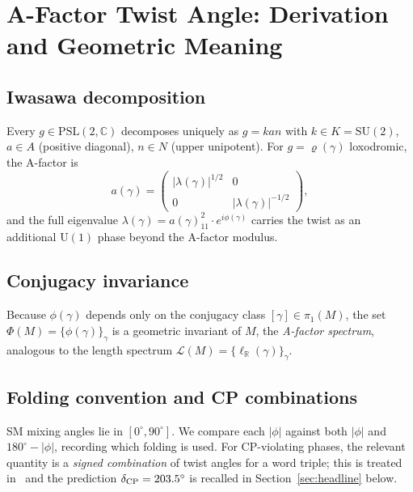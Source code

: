 ﻿\documentclass[aps,prd,twocolumn,longbibliography]{revtex4-2}
\newcommand{\PSL}{\mathrm{PSL}(2,\mathbb{C})}
\newcommand{\pioneM}{\pi_1(M)}
\newcommand{\degr}{^{\circ}}
\begin{document}
\section{A-Factor Twist Angle: Derivation and Geometric Meaning}
\label{sec:derivation}

\subsection{Iwasawa decomposition}

Every $g\in\PSL$ decomposes uniquely as $g=kan$ with
$k\in K=\mathrm{SU}(2)$, $a\in A$ (positive diagonal), $n\in N$ (upper
unipotent).
For $g=\varrho(\gamma)$ loxodromic, the A-factor is
\begin{equation}
  a(\gamma) =
  \begin{pmatrix}|\lambda(\gamma)|^{1/2}&0\\0&|\lambda(\gamma)|^{-1/2}\end{pmatrix},
\end{equation}
and the full eigenvalue $\lambda(\gamma)=a(\gamma)_{\!11}^2\cdot e^{i\phi(\gamma)}$
carries the twist as an additional $\mathrm{U}(1)$ phase beyond the A-factor modulus.

\subsection{Conjugacy invariance}

Because $\phi(\gamma)$ depends only on the conjugacy class $[\gamma]\in\pioneM$,
the set $\Phi(M)=\{\phi(\gamma)\}_\gamma$ is a geometric invariant of $M$,
the \emph{A-factor spectrum}, analogous to the length spectrum
$\mathcal{L}(M)=\{\ell_{\mathbb{R}}(\gamma)\}_\gamma$.

\subsection{Folding convention and CP combinations}

SM mixing angles lie in $[0\degr,90\degr]$.
We compare each $|\phi|$ against both $|\phi|$ and $180\degr-|\phi|$,
recording which folding is used.
For CP-violating phases, the relevant quantity is a \emph{signed combination}
of twist angles for a word triple; this is treated in~\cite{GentryCP} and
the prediction $\delta_{\rm CP}=203.5\degr$ is recalled in
Section~\ref{sec:headline} below.
\end{document}
